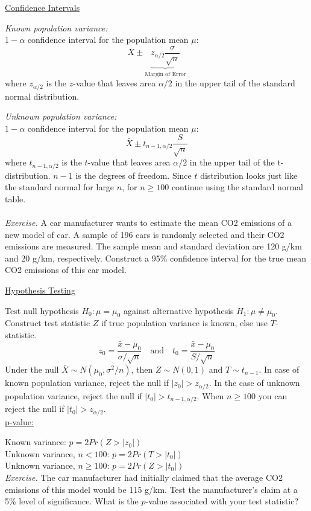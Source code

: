 \documentclass{./../handout}
\begin{document}
\thispagestyle{plain}
\begin{center}
\end{center}	
\underline{Confidence Intervals} 

\textit{Known population variance:} \\
$1-\alpha$ confidence interval for the population mean $\mu$:
$$ \bar{X} \pm  \underbrace{z_{\alpha/2}  \frac{\sigma}{\sqrt{n}}}_{\text{Margin of Error}} $$
where $z_{\alpha/2}$ is the $z$-value that leaves area $\alpha/2$ in the upper tail of the standard normal distribution. 

\textit{Unknown population variance:} \\
$1-\alpha$ confidence interval for the population mean $\mu$:
$$ \bar{X} \pm  t_{n-1,\alpha/2}  \frac{S}{\sqrt{n}} $$
where $t_{n-1,\alpha/2}$ is the $t$-value that leaves area $\alpha/2$ in the upper tail of the t-distribution. $n-1$ is the degrees of freedom. Since $t$ distribution looks just like the standard normal for large $n$, for $n \geq 100$ continue using the standard normal table. \\~\\

\textit{Exercise.} A car manufacturer wants to estimate the mean CO2 emissions of a new model of car. A sample of 196 cars is randomly selected and their CO2 emissions are measured. The sample mean and standard deviation are 120 g/km and 20 g/km, respectively. Construct a 95\% confidence interval for the true mean CO2 emissions of this car model.



\newpage
\underline{Hypothesis Testing} 

Test null hypothesis $ H_0: \mu = \mu_0 $ against alternative hypothesis $H_1: \mu \neq \mu_0$. Construct test statistic $Z$ if true population variance is known, else use $T$-statistic.  
 $$ z_0 = \frac{\bar{x}-\mu_0}{\sigma/\sqrt{n}} \quad \text{and} \quad t_0 = \frac{\bar{x}-\mu_0}{S/\sqrt{n}}  $$
Under the null $\bar{X} \sim N(\mu_0, \sigma^2/n)$, then $Z \sim N(0,1)$ and $T \sim t_{n-1}$. 
In case of known population variance, reject the null if $|z_0|>z_{\alpha/2}$. In the case of unknown population variance, reject the null if $|t_0|>t_{n-1,\alpha/2}$. When $n \geq 100$ you can reject the null if $|t_0|>z_{\alpha/2}$. \\


\underline{p-value:} 

Known variance: $ p = 2Pr(Z>|z_0|)$ \\
Unknown variance, $n<100$: $p=2Pr(T>|t_0|)$ \\
Unknown variance, $n \geq 100$:  $p=2Pr(Z>|t_0|)$ \\

\textit{Exercise.} The car manufacturer had initially claimed that the average CO2 emissions of this model would be 115 g/km. Test the manufacturer's claim at a 5\% level of significance. What is the $p$-value associated with your test statistic?
\end{document}
